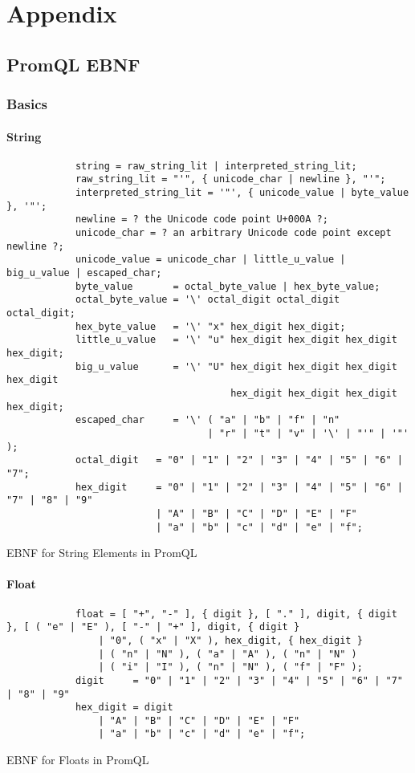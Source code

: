 \chapter{Appendix}
\section{PromQL EBNF}
\subsection{Basics}
\subsubsection{String}
\begin{listing}[H]
	\begin{samepage}
		\begin{verbatim}
			string = raw_string_lit | interpreted_string_lit;
			raw_string_lit = "'", { unicode_char | newline }, "'";
			interpreted_string_lit = '"', { unicode_value | byte_value }, '"';
			newline = ? the Unicode code point U+000A ?;
			unicode_char = ? an arbitrary Unicode code point except newline ?;
			unicode_value = unicode_char | little_u_value | big_u_value | escaped_char;
			byte_value       = octal_byte_value | hex_byte_value;
			octal_byte_value = '\' octal_digit octal_digit octal_digit;
			hex_byte_value   = '\' "x" hex_digit hex_digit;
			little_u_value   = '\' "u" hex_digit hex_digit hex_digit hex_digit;
			big_u_value      = '\' "U" hex_digit hex_digit hex_digit hex_digit
			                           hex_digit hex_digit hex_digit hex_digit;
			escaped_char     = '\' ( "a" | "b" | "f" | "n" 
			                       | "r" | "t" | "v" | '\' | "'" | '"' );
			octal_digit   = "0" | "1" | "2" | "3" | "4" | "5" | "6" | "7";
			hex_digit     = "0" | "1" | "2" | "3" | "4" | "5" | "6" | "7" | "8" | "9"
					      | "A" | "B" | "C" | "D" | "E" | "F"
					      | "a" | "b" | "c" | "d" | "e" | "f";
		\end{verbatim}
		\caption{EBNF for String Elements in PromQL}
	\end{samepage}
\end{listing}

\subsubsection{Float}
\begin{listing}[H]
	\begin{samepage}
		\begin{verbatim}
			float = [ "+", "-" ], { digit }, [ "." ], digit, { digit }, [ ( "e" | "E" ), [ "-" | "+" ], digit, { digit }
				| "0", ( "x" | "X" ), hex_digit, { hex_digit }
				| ( "n" | "N" ), ( "a" | "A" ), ( "n" | "N" )
				| ( "i" | "I" ), ( "n" | "N" ), ( "f" | "F" );
			digit     = "0" | "1" | "2" | "3" | "4" | "5" | "6" | "7" | "8" | "9"
			hex_digit = digit
				| "A" | "B" | "C" | "D" | "E" | "F"
				| "a" | "b" | "c" | "d" | "e" | "f";
		\end{verbatim}
		\caption{EBNF for Floats in PromQL}
	\end{samepage}
\end{listing}

